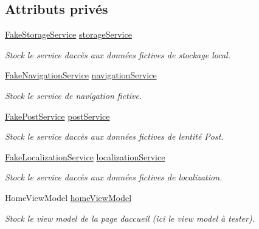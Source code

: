 \subsection*{Attributs privés}
\begin{DoxyCompactItemize}
\item 
\hyperlink{class_boxes_1_1_tests_1_1_mock_1_1_services_1_1_fake_storage_service}{Fake\+Storage\+Service} \hyperlink{class_boxes_1_1_tests_1_1_home_view_model_tests_a3cef168c7e8bcdbee02a6713e4541105}{storage\+Service}
\begin{DoxyCompactList}\small\item\em Stock le service d\textquotesingle{}accès aux données fictives de stockage local. \end{DoxyCompactList}\item 
\hyperlink{class_boxes_1_1_tests_1_1_mock_1_1_services_1_1_fake_navigation_service}{Fake\+Navigation\+Service} \hyperlink{class_boxes_1_1_tests_1_1_home_view_model_tests_aa4981a7ac7b616762cfc1703b52c42d1}{navigation\+Service}
\begin{DoxyCompactList}\small\item\em Stock le service de navigation fictive. \end{DoxyCompactList}\item 
\hyperlink{class_boxes_1_1_tests_1_1_mock_1_1_services_1_1_fake_post_service}{Fake\+Post\+Service} \hyperlink{class_boxes_1_1_tests_1_1_home_view_model_tests_a2bfaed74f121657195e437b0dfca8eb2}{post\+Service}
\begin{DoxyCompactList}\small\item\em Stock le service d\textquotesingle{}accès aux données fictives de l\textquotesingle{}entité Post. \end{DoxyCompactList}\item 
\hyperlink{class_boxes_1_1_tests_1_1_mock_1_1_services_1_1_fake_localization_service}{Fake\+Localization\+Service} \hyperlink{class_boxes_1_1_tests_1_1_home_view_model_tests_a0451d15ae4b229db13798e8c6ddd966f}{localization\+Service}
\begin{DoxyCompactList}\small\item\em Stock le service d\textquotesingle{}accès aux données fictives de localization. \end{DoxyCompactList}\item 
Home\+View\+Model \hyperlink{class_boxes_1_1_tests_1_1_home_view_model_tests_a5e19b63ded52862d0545d317fc2406e0}{home\+View\+Model}
\begin{DoxyCompactList}\small\item\em Stock le view model de la page d\textquotesingle{}accueil (ici le view model à tester). \end{DoxyCompactList}\end{DoxyCompactItemize}
